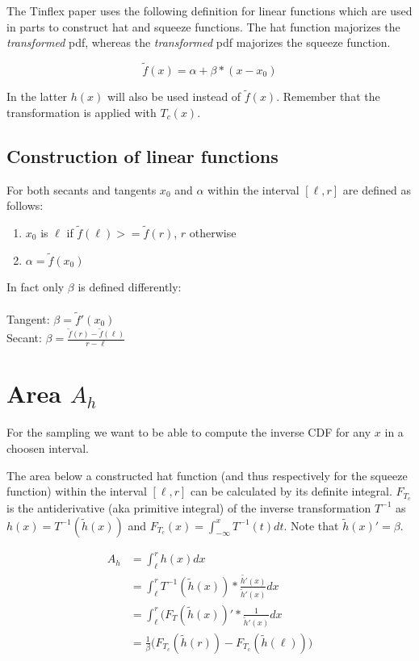 \documentclass[]{article}
\begin{document}
The Tinflex paper uses the following definition for linear functions which are used in parts to construct hat and squeeze functions. The hat function majorizes the \textit{transformed} pdf, whereas the \textit{transformed} pdf majorizes the squeeze function.

\[ \tilde{f}(x) = \alpha + \beta * (x - x_0) \]

In the latter $h(x)$ will also be used instead of $\tilde{f}(x)$.
Remember that the transformation is applied with $T_c(x)$.

\subsection{Construction of linear functions}

For both secants and tangents $x_0$ and $\alpha$ within the interval $[\ell, r]$ are defined as follows:

\begin{enumerate}
\item $x_0$ is $\ell$ if $\tilde{f}(\ell) >= \tilde{f}(r)$, $r$ otherwise
\item $\alpha = \tilde{f}(x_0)$
\end{enumerate}

In fact only $\beta$ is defined differently: \\ 
\ \\
Tangent: $\beta = \tilde{f}'(x_0)$ \\ 
Secant:  $\beta = \frac{\tilde{f}(r) - \tilde{f}(\ell)}{r - \ell}$


\section{Area $A_h$}

For the sampling we want to be able to compute the inverse CDF for any $x$ in a choosen interval.

The area below a constructed hat function (and thus respectively for the squeeze function) within the interval $[\ell, r]$ can be calculated by its definite integral. $F_{T_c}$ is the antiderivative (aka primitive integral) of the inverse transformation $T^{-1}$ as $h(x) = T^{-1}(\tilde{h}(x))$ and $F_{T_c}(x) = \int_{-\infty}^{x} T^{-1}(t) dt$. Note that $\tilde{h}(x)' = \beta$.

\begin{align*}
A_h &= \int_{\ell}^{r} h(x) dx \\
	&= \int_{\ell}^{r} T^{-1}(\tilde{h}(x)) * \frac{\tilde{h'}(x)}{\tilde{h}'(x)} dx \\
	&= \int_{\ell}^{r} (F_T(\tilde{h}(x))' * \frac{1}{\tilde{h}'(x)} dx \\
&= \frac{1}{\beta} \big( F_{T_c} (\tilde{h}(r)) - F_{T_c}(\tilde{h}(\ell)) \big)
\end{align*}
\end{document}
